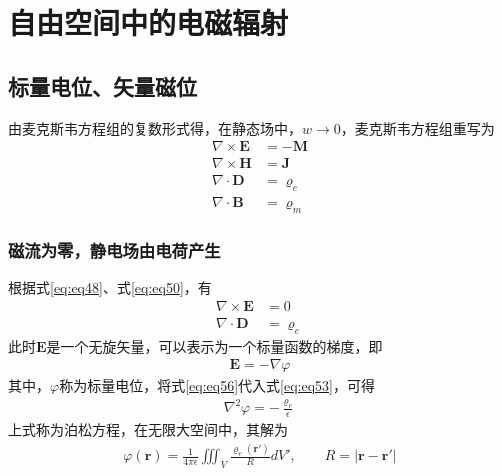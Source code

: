 \documentclass{article}
\numberwithin{equation}{section}
\renewcommand{\vec}[1]{\boldsymbol{#1}}
\begin{document}
\section{自由空间中的电磁辐射}
\subsection{标量电位、矢量磁位}
由麦克斯韦方程组的复数形式得，在静态场中，$w \to 0$，麦克斯韦方程组重写为
\begin{align}
    \label{eq:eq48}
    \nabla \times \mathbf{E}&=-\mathbf{M} \\
    \label{eq:eq49}
    \nabla \times \mathbf{H}&=\mathbf{J} \\
    \label{eq:eq50}
    \nabla \cdot \mathbf{D}&=\varrho _{e} \\
    \label{eq:eq51}
    \nabla \cdot \mathbf{B}&=\varrho _{m}
\end{align}
\subsubsection{磁流为零，静电场由电荷产生}
根据式\ref{eq:eq48}、式\ref{eq:eq50}，有
\begin{align}
    \label{eq:eq52}
    \nabla \times \mathbf{E}&=0 \\
    \label{eq:eq53}
    \nabla \cdot \mathbf{D}&=\varrho _{e}
\end{align}
此时$\mathbf{E}$是一个无旋矢量，可以表示为一个标量函数的梯度，即
\begin{align}
    \label{eq:eq56}
    \mathbf{E}=-\nabla \varphi
\end{align}
其中，$\varphi$称为标量电位，将式\ref{eq:eq56}代入式\ref{eq:eq53}，可得
\begin{align}
    \label{eq:eq58}
    \nabla^2\varphi =-\frac{\varrho _{e}}{\epsilon}
\end{align}
上式称为泊松方程，在无限大空间中，其解为
\begin{align}
    \label{eq:eq60}
    \varphi(\vec{r})=\frac{1}{4\pi \epsilon}\iiint_V\frac{\varrho _e(\vec{r}')}{R}dV',\qquad R=|\vec{r}-\vec{r}'|
\end{align}
\end{document}

